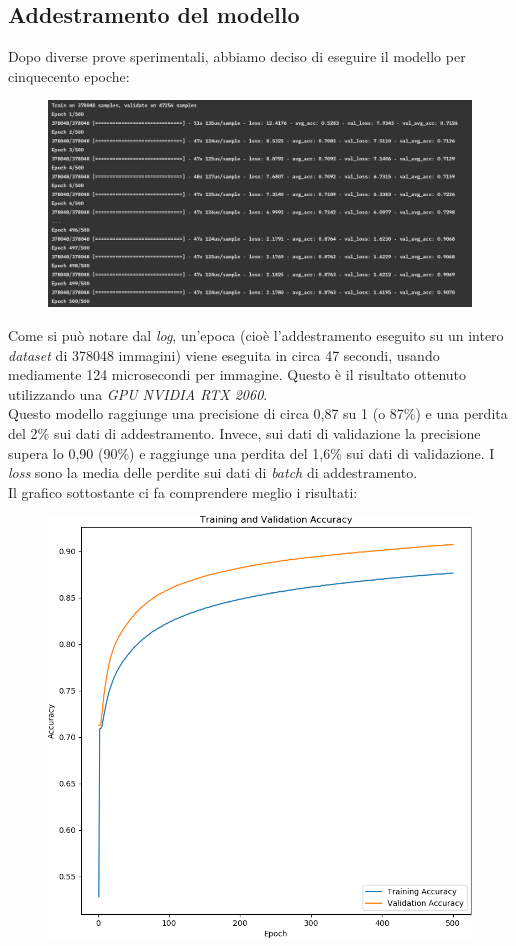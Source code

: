 \subsection{Addestramento del modello}
Dopo diverse prove sperimentali, abbiamo deciso di eseguire il modello per cinquecento epoche:
\begin{figure}[H]
	\centering
	\includegraphics[scale=0.8]{./images/storia.png}
\end{figure}
\noindent Come si può notare dal \textit{log}, un’epoca (cioè l’addestramento eseguito su un intero \textit{dataset} di 378048 immagini) viene eseguita in circa 47 secondi, usando mediamente 124 microsecondi per immagine. Questo è il risultato ottenuto utilizzando una \textit{GPU NVIDIA RTX 2060}.\\
\newline
Questo modello raggiunge una precisione di circa 0,87 su 1 (o 87\%) e una perdita del 2\% sui dati di addestramento. Invece, sui dati di validazione la precisione supera lo 0,90 (90\%) e raggiunge una perdita del 1,6\% sui dati di validazione. I \textit{loss} sono la media delle perdite sui dati di \textit{batch} di addestramento.\\
\newline
Il grafico sottostante ci fa comprendere meglio i risultati:
\begin{figure}[H]
	\centering
	\includegraphics[scale=0.40]{./images/plot.png}
\end{figure}
